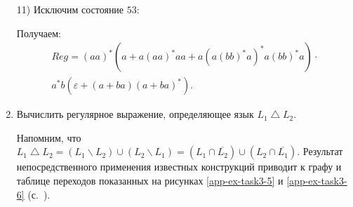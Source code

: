 \begin{enumerate}[label=(\roman{*})]
\begin{minipage}{\linewidth}
{
}
\end{minipage}

\begin{minipage}{\linewidth}
		11) Исключим состояние $53$:
        
\end{minipage}

Получаем:
\begin{multline*}
    Reg = (aa)^*(a + a(aa)^*aa + a(a(bb)^*a)^*a(bb)^*a)\cdot \\a^*b(\varepsilon + (a + ba)(a + ba)^*).
\end{multline*}
		
	\item Вычислить регулярное выражение, определяющее язык $L_1 \bigtriangleup L_2$.
    
    Напомним, что
	$
        L_1 \bigtriangleup L_2 = (L_1 \backslash L_2)\cup(L_2 \backslash L_1) = (L_1 \cap \overline{L_2}) \cup (L_2 \cap \overline{L_1})
    $.
    Результат непосредственного применения известных конструкций
    приводит к графу и таблице переходов показанных на рисунках
    \ref{app-ex-task3-5} и \ref{app-ex-task3-6} (с.~\pageref{app-ex-task3-6}).


\end{enumerate}
